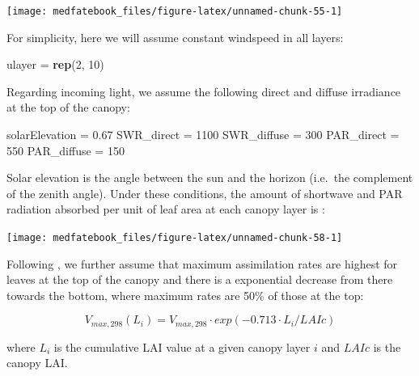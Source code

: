 \documentclass[]{book}
\newenvironment{Shaded}{\begin{snugshade}}{\end{snugshade}}
\newcommand{\KeywordTok}[1]{\textcolor[rgb]{0.13,0.29,0.53}{\textbf{#1}}}
\newcommand{\DecValTok}[1]{\textcolor[rgb]{0.00,0.00,0.81}{#1}}
\newcommand{\FloatTok}[1]{\textcolor[rgb]{0.00,0.00,0.81}{#1}}
\newcommand{\StringTok}[1]{\textcolor[rgb]{0.31,0.60,0.02}{#1}}
\newcommand{\NormalTok}[1]{#1}
\begin{document}
\begin{center}\texttt{[image: medfatebook\_files/figure-latex/unnamed-chunk-55-1]} \end{center}

For simplicity, here we will assume constant windspeed in all layers:

\begin{Shaded}
\begin{Highlighting}[]
\NormalTok{ulayer =}\StringTok{ }\KeywordTok{rep}\NormalTok{(}\DecValTok{2}\NormalTok{, }\DecValTok{10}\NormalTok{)}
\end{Highlighting}
\end{Shaded}

Regarding incoming light, we assume the following direct and diffuse
irradiance at the top of the canopy:

\begin{Shaded}
\begin{Highlighting}[]
\NormalTok{solarElevation =}\StringTok{ }\FloatTok{0.67}
\NormalTok{SWR_direct =}\StringTok{ }\DecValTok{1100}
\NormalTok{SWR_diffuse =}\StringTok{ }\DecValTok{300}
\NormalTok{PAR_direct =}\StringTok{ }\DecValTok{550}
\NormalTok{PAR_diffuse =}\StringTok{ }\DecValTok{150}
\end{Highlighting}
\end{Shaded}

Solar elevation is the angle between the sun and the horizon (i.e.~the
complement of the zenith angle). Under these conditions, the amount of
shortwave and PAR radiation absorbed per unit of leaf area at each
canopy layer is \citep{Anten2016}:

\begin{center}\texttt{[image: medfatebook\_files/figure-latex/unnamed-chunk-58-1]} \end{center}

Following \citet{DePury1997}, we further assume that maximum
assimilation rates are highest for leaves at the top of the canopy and
there is a exponential decrease from there towards the bottom, where
maximum rates are 50\% of those at the top:

\begin{equation}
V_{max,298}(L_i) =V_{max,298}\cdot exp(-0.713\cdot L_i/LAIc)   
\end{equation}

where \(L_i\) is the cumulative LAI value at a given canopy layer \(i\)
and \(LAIc\) is the canopy LAI.
\end{document}
